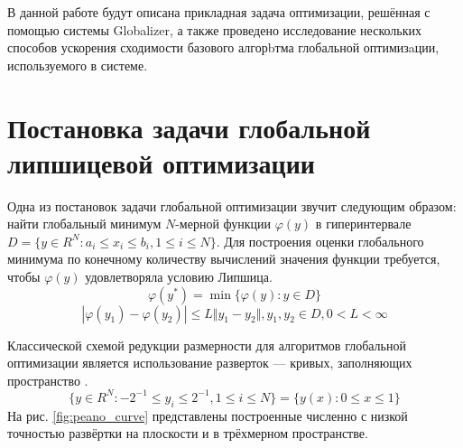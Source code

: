 В данной работе будут описана прикладная задача оптимизации, решённая с помощью системы
Globalizer, а также проведено исследование нескольких способов ускорения сходимости
базового алгорbтма глобальной оптимизaции, используемого в системе.

\section{Постановка задачи глобальной липшицевой оптимизации}
Одна из постановок задачи глобальной оптимизации звучит следующим образом: найти
глобальный минимум \(N\)-мерной функции \(\varphi(y)\) в гиперинтервале
\(D=\{y\in R^N:a_i\leqslant x_i\leqslant{b_i}, 1\leqslant{i}\leqslant{N}\}\).
Для построения оценки глобального минимума по конечному количеству вычислений
значения функции требуется, чтобы \(\varphi(y)\) удовлетворяла условию Липшица.
\begin{displaymath}
\label{task}
\varphi(y^*)=\min\{\varphi(y):y\in D\}
\end{displaymath}
\begin{displaymath}
\label{lip}
|\varphi(y_1)-\varphi(y_2)|\leqslant L\Vert y_1-y_2\Vert,y_1,y_2\in D,0<L<\infty
\end{displaymath}

Классической схемой редукции размерности для алгоритмов глобальной оптимизации является
использование разверток --- кривых, заполняющих пространство \cite{strOptBook}.
\begin{displaymath}
\label{cube}
\lbrace y\in R^N:-2^{-1}\leqslant y_i\leqslant 2^{-1},1\leqslant i\leqslant N\rbrace=\{y(x):0\leqslant x\leqslant 1\}
\end{displaymath}
На рис. \ref{fig:peano_curve} представлены построенные численно с низкой точностью развёртки на плоскости и
в трёхмерном пространстве.

